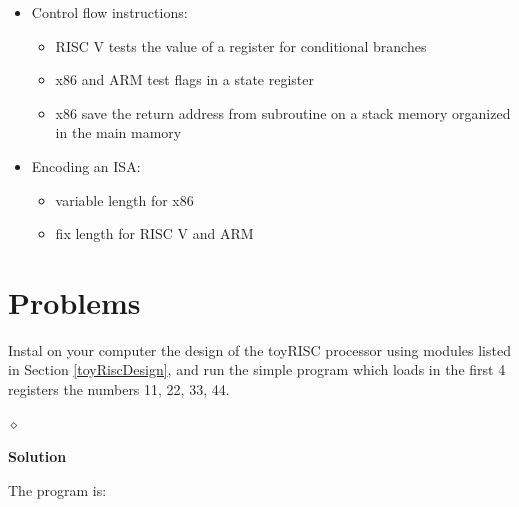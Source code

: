 \begin{itemize}
\begin{itemize}
\begin{itemize}
                    \item floats: add, sub, mult, div, rem
                \end{itemize}
            \item logic: minimally AND and XOR
            \item control: jumps, conditional branches, calls, ret, ...
        \end{itemize}
    \item Control flow instructions:
        \begin{itemize}
            \item RISC V tests the value of a register for conditional branches
            \item x86 and ARM test flags in a state register
            \item x86 save the return address from subroutine on a stack memory organized in the main mamory
        \end{itemize}
    \item Encoding an ISA:
        \begin{itemize}
            \item variable length for x86
            \item fix length for RISC V and ARM
        \end{itemize}
\end{itemize}


\section{Problems}

\begin{problem}
Instal on your computer the design of the toyRISC processor using modules listed in Section \ref{toyRiscDesign}, and run the simple program which loads in the first 4 registers the numbers 11, 22, 33, 44.

$\diamond$
\end{problem}

{\bf Solution}

The program is:

